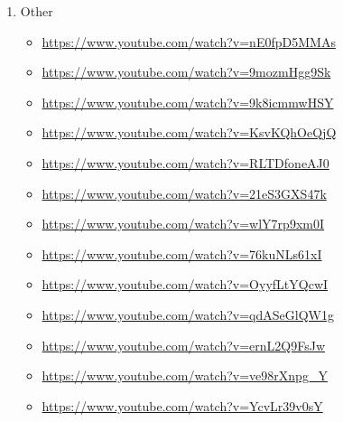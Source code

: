 \begin{enumerate}
\item Other
\label{sec:org68b1331}
\begin{itemize}
\item \url{https://www.youtube.com/watch?v=nE0fpD5MMAs}
\item \url{https://www.youtube.com/watch?v=9mozmHgg9Sk}
\item \url{https://www.youtube.com/watch?v=9k8icmmwHSY}
\item \url{https://www.youtube.com/watch?v=KsvKQhOeQjQ}
\item \url{https://www.youtube.com/watch?v=RLTDfoneAJ0}
\item \url{https://www.youtube.com/watch?v=21eS3GXS47k}
\item \url{https://www.youtube.com/watch?v=wlY7rp9xm0I}
\item \url{https://www.youtube.com/watch?v=76kuNLs61xI}
\item \url{https://www.youtube.com/watch?v=OyyfLtYQcwI}
\item \url{https://www.youtube.com/watch?v=qdASeGlQW1g}
\item \url{https://www.youtube.com/watch?v=ernL2Q9FsJw}
\item \url{https://www.youtube.com/watch?v=ve98rXnpg\_Y}
\item \url{https://www.youtube.com/watch?v=YcvLr39v0sY}
\end{itemize}


\end{enumerate}
